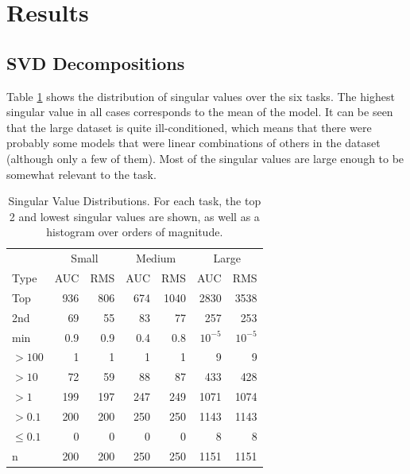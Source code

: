 \documentclass{article}
\begin{document}
\section{Results}

\subsection{SVD Decompositions}

Table \ref{table:sv-distributions} shows the distribution of singular values over the six tasks.  The highest singular value in all cases corresponds to the mean of the model.  It can be seen that the large dataset is quite ill-conditioned, which means that there were probably some models that were linear combinations of others in the dataset (although only a few of them).  Most of the singular values are large enough to be somewhat relevant to the task.


\begin{table}[t]
\caption{Singular Value Distributions.  For each task, the top 2 and lowest singular values are shown, as well as a histogram over orders of magnitude.}
\label{table:sv-distributions}
\vskip 0.15in
\begin{center}
\begin{small}
\begin{sc}
\begin{tabular}{lrrrrrr}
\hline
\abovespace\belowspace
& \multicolumn{2}{c}{Small} & \multicolumn{2}{c}{Medium} & \multicolumn{2}{c}{Large} \\
Type & AUC & RMS & AUC & RMS & AUC & RMS \\
\hline
\abovespace
Top        & 936 & 806 & 674 & 1040 & 2830   & 3538 \\
2nd        &  69 &  55 &  83 &   77 &  257   &  253 \\
min        & 0.9 & 0.9 & 0.4 &  0.8 & $10^{-5}$& $10^{-5}$ \\
\abovespace
$> 100$    &   1 &   1 &   1 &    1 &    9   &    9 \\
$> 10$     &  72 &  59 &  88 &   87 &  433   &  428 \\
$> 1$      & 199 & 197 & 247 &  249 & 1071   & 1074 \\
$> 0.1$    & 200 & 200 & 250 &  250 & 1143   & 1143 \\
$\leq 0.1$ &   0 &   0 &   0 &    0 &    8   &    8 \\
\belowspace
n          & 200 & 200 & 250 &  250 & 1151   & 1151 \\
\hline
\end{tabular}
\end{sc}
\end{small}
\end{center}
\vskip -0.1in
\end{table}
\end{document}
